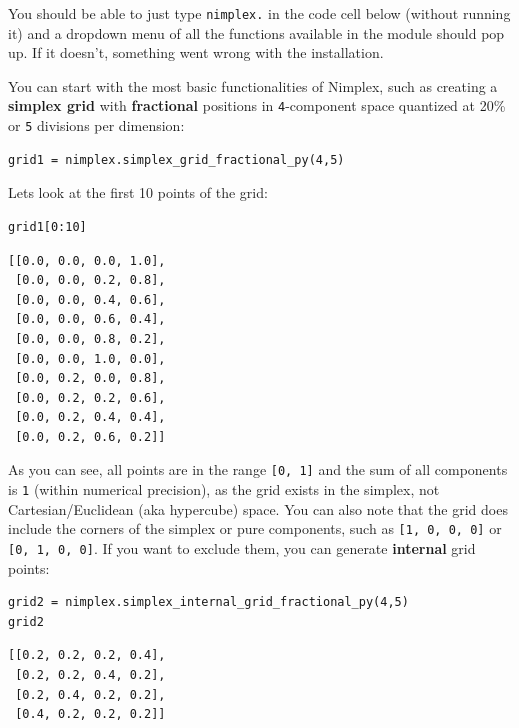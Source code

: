 You should be able to just type \texttt{nimplex.} in
the code cell below (without running it) and a dropdown menu of all the
functions available in the module should pop up. If it doesn't,
something went wrong with the installation.

You can start with the most basic functionalities of Nimplex, such as
creating a \textbf{simplex grid} with \textbf{fractional} positions in
\texttt{4}-component space quantized at 20\% or
\texttt{5} divisions per dimension:

\begin{verbatim}
grid1 = nimplex.simplex_grid_fractional_py(4,5)
\end{verbatim}

Lets look at the first 10 points of the grid:

\begin{verbatim}
grid1[0:10]
\end{verbatim}

\begin{verbatim}
[[0.0, 0.0, 0.0, 1.0],
 [0.0, 0.0, 0.2, 0.8],
 [0.0, 0.0, 0.4, 0.6],
 [0.0, 0.0, 0.6, 0.4],
 [0.0, 0.0, 0.8, 0.2],
 [0.0, 0.0, 1.0, 0.0],
 [0.0, 0.2, 0.0, 0.8],
 [0.0, 0.2, 0.2, 0.6],
 [0.0, 0.2, 0.4, 0.4],
 [0.0, 0.2, 0.6, 0.2]]
\end{verbatim}

As you can see, all points are in the range
\texttt{[0, 1]} and the sum of all components is
\texttt{1} (within numerical precision), as the grid
exists in the simplex, not Cartesian/Euclidean (aka hypercube) space.
You can also note that the grid does include the corners of the simplex
or pure components, such as \texttt{[1, 0, 0, 0]} or
\texttt{[0, 1, 0, 0]}. If you want to exclude them, you
can generate \textbf{internal} grid points:

\begin{verbatim}
grid2 = nimplex.simplex_internal_grid_fractional_py(4,5)
grid2
\end{verbatim}

\begin{verbatim}
[[0.2, 0.2, 0.2, 0.4],
 [0.2, 0.2, 0.4, 0.2],
 [0.2, 0.4, 0.2, 0.2],
 [0.4, 0.2, 0.2, 0.2]]
\end{verbatim}

